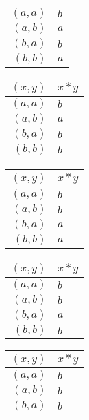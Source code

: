 \begin{enumerate}[label={\Alph*.},font={\bfseries}]
\begin{enumerate}[label={\arabic*},font={\bfseries}]
\begin{minipage}[h]{.25\textwidth}
\begin{tabular}{ r | l }
        \hline
        $(a,a)$ & $b$ \\
        $(a,b)$ & $a$ \\
        $(b,a)$ & $b$ \\
        $(b,b)$ & $a$
      \end{tabular}
    \end{minipage}
    \begin{minipage}[h]{.25\textwidth}
      \begin{tabular}{ r | l }
        $(x,y)$ & $x*y$ \\
        \hline
        $(a,a)$ & $b$ \\
        $(a,b)$ & $a$ \\
        $(b,a)$ & $b$ \\
        $(b,b)$ & $b$
      \end{tabular}
    \end{minipage}
    \begin{minipage}[h]{.25\textwidth}
      \begin{tabular}{ r | l }
        $(x,y)$ & $x*y$ \\
        \hline
        $(a,a)$ & $b$ \\
        $(a,b)$ & $b$ \\
        $(b,a)$ & $a$ \\
        $(b,b)$ & $a$
      \end{tabular}
    \end{minipage}
    \begin{minipage}[h]{.25\textwidth}
      \begin{tabular}{ r | l }
        $(x,y)$ & $x*y$ \\
        \hline
        $(a,a)$ & $b$ \\
        $(a,b)$ & $b$ \\
        $(b,a)$ & $a$ \\
        $(b,b)$ & $b$
      \end{tabular}
    \end{minipage}
    \begin{minipage}[h]{.25\textwidth}
      \begin{tabular}{ r | l }
        $(x,y)$ & $x*y$ \\
        \hline
        $(a,a)$ & $b$ \\
        $(a,b)$ & $b$ \\
        $(b,a)$ & $b$ \\

\end{tabular}
\end{minipage}
\end{enumerate}
\end{enumerate}
